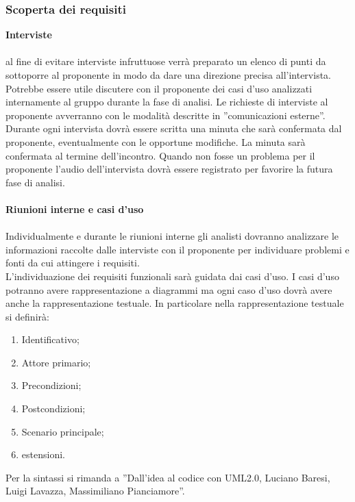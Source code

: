 {{		\subsubsection{Scoperta dei requisiti}{
			\textbf{Interviste}\\\\
			al fine di evitare interviste infruttuose verrà preparato un elenco di punti da sottoporre al proponente in modo da dare una direzione precisa all’intervista. Potrebbe essere utile discutere con il proponente dei casi d'uso analizzati internamente al gruppo durante la fase di analisi.
			Le richieste di interviste al proponente avverranno con le modalità descritte in ”comunicazioni esterne”. Durante ogni intervista dovrà essere scritta una minuta che sarà confermata dal proponente, eventualmente con le opportune modifiche. La minuta sarà confermata al termine dell’incontro. Quando non fosse un problema per il proponente l’audio dell’intervista dovrà essere registrato per favorire la futura fase di analisi.\\\\
			\textbf{Riunioni interne e casi d'uso}\\\\
			Individualmente e durante le riunioni interne gli analisti dovranno analizzare le informazioni raccolte dalle interviste con il proponente per individuare problemi e fonti da cui attingere i requisiti.\\
			L’individuazione dei requisiti funzionali sarà guidata dai casi d’uso. I casi d’uso potranno avere rappresentazione a diagrammi ma ogni caso d’uso dovrà avere anche la rappresentazione testuale. In particolare nella rappresentazione testuale si definirà:
			\begin{enumerate}
				\item Identificativo;
				\item Attore primario;
				\item Precondizioni;
				\item Postcondizioni;
				\item Scenario principale;
				\item estensioni.
			\end{enumerate}
			Per la sintassi si rimanda a ”Dall’idea al codice con UML2.0, Luciano Baresi, Luigi Lavazza, Massimiliano Pianciamore”.
			}
}}

